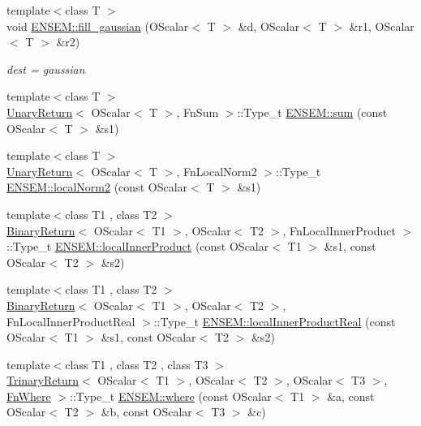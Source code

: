 \begin{DoxyCompactItemize}
{\footnotesize template$<$class T $>$ }\\void \mbox{\hyperlink{group__obsscalar_gaf665bb772c121b0cab02a5f3244b4c3d}{E\+N\+S\+E\+M\+::fill\+\_\+gaussian}} (O\+Scalar$<$ T $>$ \&d, O\+Scalar$<$ T $>$ \&r1, O\+Scalar$<$ T $>$ \&r2)
\begin{DoxyCompactList}\small\item\em dest = gaussian \end{DoxyCompactList}\item 
{\footnotesize template$<$class T $>$ }\\\mbox{\hyperlink{structUnaryReturn}{Unary\+Return}}$<$ O\+Scalar$<$ T $>$, Fn\+Sum $>$\+::Type\+\_\+t \mbox{\hyperlink{group__obsscalar_ga969a0fc381c5a006e976f67c513c4828}{E\+N\+S\+E\+M\+::sum}} (const O\+Scalar$<$ T $>$ \&s1)
\item 
{\footnotesize template$<$class T $>$ }\\\mbox{\hyperlink{structUnaryReturn}{Unary\+Return}}$<$ O\+Scalar$<$ T $>$, Fn\+Local\+Norm2 $>$\+::Type\+\_\+t \mbox{\hyperlink{group__obsscalar_ga2bc0a069388839d76a68f281dce936a6}{E\+N\+S\+E\+M\+::local\+Norm2}} (const O\+Scalar$<$ T $>$ \&s1)
\item 
{\footnotesize template$<$class T1 , class T2 $>$ }\\\mbox{\hyperlink{structBinaryReturn}{Binary\+Return}}$<$ O\+Scalar$<$ T1 $>$, O\+Scalar$<$ T2 $>$, Fn\+Local\+Inner\+Product $>$\+::Type\+\_\+t \mbox{\hyperlink{group__obsscalar_ga17966d3d3b6922670f83bb3f96b1cd76}{E\+N\+S\+E\+M\+::local\+Inner\+Product}} (const O\+Scalar$<$ T1 $>$ \&s1, const O\+Scalar$<$ T2 $>$ \&s2)
\item 
{\footnotesize template$<$class T1 , class T2 $>$ }\\\mbox{\hyperlink{structBinaryReturn}{Binary\+Return}}$<$ O\+Scalar$<$ T1 $>$, O\+Scalar$<$ T2 $>$, Fn\+Local\+Inner\+Product\+Real $>$\+::Type\+\_\+t \mbox{\hyperlink{group__obsscalar_ga83c87e37c0e8b624401c37ff72a5f23c}{E\+N\+S\+E\+M\+::local\+Inner\+Product\+Real}} (const O\+Scalar$<$ T1 $>$ \&s1, const O\+Scalar$<$ T2 $>$ \&s2)
\item 
{\footnotesize template$<$class T1 , class T2 , class T3 $>$ }\\\mbox{\hyperlink{structTrinaryReturn}{Trinary\+Return}}$<$ O\+Scalar$<$ T1 $>$, O\+Scalar$<$ T2 $>$, O\+Scalar$<$ T3 $>$, \mbox{\hyperlink{structFnWhere}{Fn\+Where}} $>$\+::Type\+\_\+t \mbox{\hyperlink{group__obsscalar_gacb54937c6368c2a99fd2eaecc1221360}{E\+N\+S\+E\+M\+::where}} (const O\+Scalar$<$ T1 $>$ \&a, const O\+Scalar$<$ T2 $>$ \&b, const O\+Scalar$<$ T3 $>$ \&c)

\end{DoxyCompactItemize}

